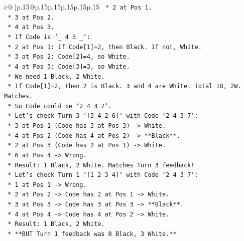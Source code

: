 \documentclass{article}
\begin{document}
{\begin{supertabular}{c@{$\;$}|p{.15\linewidth}@{}p{.15\linewidth}p{.15\linewidth}p{.15\linewidth}p{.15\linewidth}p{.15\linewidth}}
{{{\texttt{                    *   2 at Pos 1.} \\
\texttt{                    *   3 at Pos 2.} \\
\texttt{                    *   4 at Pos 3.} \\
\texttt{                    *   If Code is `\_ 4 3 \_`:} \\
\texttt{                        *   2 at Pos 1: If Code{[}1{]}=2, then Black. If not, White.} \\
\texttt{                        *   3 at Pos 2: Code{[}2{]}=4, so White.} \\
\texttt{                        *   4 at Pos 3: Code{[}3{]}=3, so White.} \\
\texttt{                    *   We need 1 Black, 2 White.} \\
\texttt{                    *   If Code{[}1{]}=2, then 2 is Black. 3 and 4 are White. Total 1B, 2W. Matches.} \\
\texttt{                    *   So Code could be `2 4 3 7`.} \\
\texttt{                *   Let's check Turn 3 `{[}3 4 2 6{]}` with Code `2 4 3 7`:} \\
\texttt{                    *   3 at Pos 1 (Code has 3 at Pos 3) {-}> White.} \\
\texttt{                    *   4 at Pos 2 (Code has 4 at Pos 2) {-}> **Black**.} \\
\texttt{                    *   2 at Pos 3 (Code has 2 at Pos 1) {-}> White.} \\
\texttt{                    *   6 at Pos 4 {-}> Wrong.} \\
\texttt{                    *   Result: 1 Black, 2 White. Matches Turn 3 feedback!} \\
\texttt{                *   Let's check Turn 1 `{[}1 2 3 4{]}` with Code `2 4 3 7`:} \\
\texttt{                    *   1 at Pos 1 {-}> Wrong.} \\
\texttt{                    *   2 at Pos 2 {-}> Code has 2 at Pos 1 {-}> White.} \\
\texttt{                    *   3 at Pos 3 {-}> Code has 3 at Pos 3 {-}> **Black**.} \\
\texttt{                    *   4 at Pos 4 {-}> Code has 4 at Pos 2 {-}> White.} \\
\texttt{                    *   Result: 1 Black, 2 White.} \\
\texttt{                    *   **BUT Turn 1 feedback was 0 Black, 3 White.**} \\
}}}
\end{supertabular}}
\end{document}
